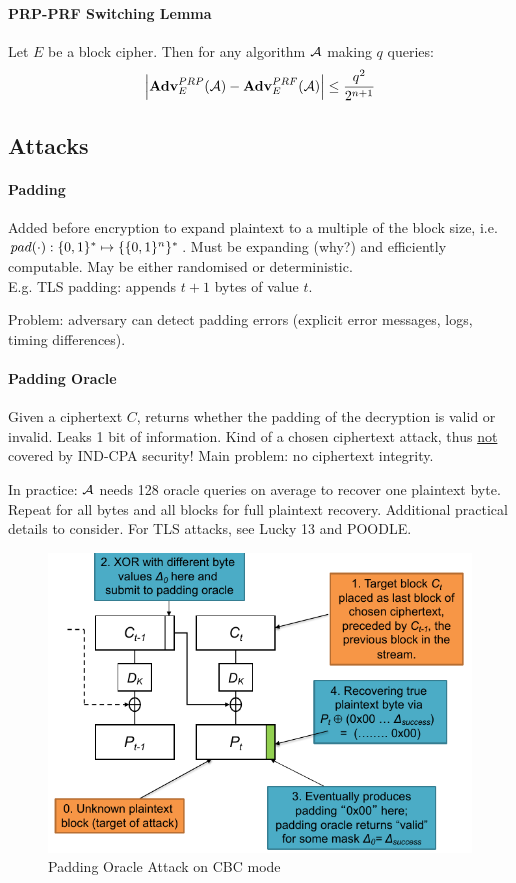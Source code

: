 \paragraph{PRP-PRF Switching Lemma}
Let $E$ be a block cipher.
Then for any algorithm $\mathcal{A}$ making $q$ queries:
$$
\Big| \mathbf{Adv}^{PRP}_{E} (\mathcal{A}) - \mathbf{Adv}^{PRF}_{E} (\mathcal{A}) \Big| \leq \frac{q^2}{2^{n+1}}
$$



\subsection{Attacks}

\paragraph{Padding}
Added before encryption to expand plaintext to a multiple of the block size, i.e. \\$pad(\cdot): \lbrace 0, 1 \rbrace^* \mapsto \{ \lbrace 0, 1 \rbrace^n \}^*$.
Must be expanding (why?) and efficiently computable.
May be either randomised or deterministic.
\\
E.g. TLS padding: appends $t+1$ bytes of value $t$.

Problem: adversary can detect padding errors (explicit error messages, logs, timing differences).

\paragraph{Padding Oracle}
Given a ciphertext $C$, returns whether the padding of the decryption is valid or invalid.
Leaks 1 bit of information.
Kind of a chosen ciphertext attack, thus \underline{not} covered by IND-CPA security!
Main problem: no ciphertext integrity.

In practice:
$\mathcal{A}$ needs 128 oracle queries on average to recover one plaintext byte.
Repeat for all bytes and all blocks for full plaintext recovery.
Additional practical details to consider.
For TLS attacks, see Lucky 13 and POODLE.

\begin{figure}[h]
    \centering
	\includegraphics[scale=0.6]{images/cbc-padding-oracle-attack.png}
    \caption{Padding Oracle Attack on CBC mode}
    \label{fig:cbc-padding-oracle-attack}
\end{figure}

